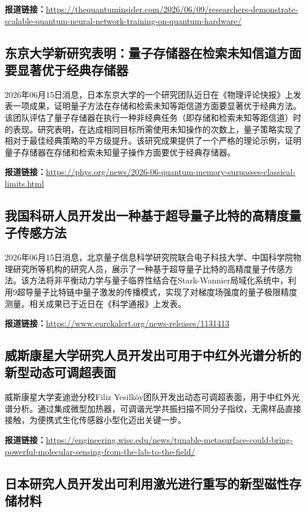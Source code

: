 \documentclass[12pt,a4paper]{ctexart}
\begin{document}
\noindent\textbf{报道链接：}\url{https://thequantuminsider.com/2026/06/09/researchers-demonstrate-scalable-quantum-neural-network-training-on-quantum-hardware/}

\subsection{ 东京大学新研究表明：量子存储器在检索未知信道方面要显著优于经典存储器 }

2026年06月15日消息，日本东京大学的一个研究团队近日在《物理评论快报》上发表一项成果，证明量子方法在存储和检索未知等距信道方面要显著优于经典方法。该团队评估了量子存储器在执行一种非经典任务（即存储和检索未知等距信道）时的表现。研究表明，在达成相同目标所需使用未知操作的次数上，量子策略实现了相对于最佳经典策略的平方级提升。该研究成果提供了一个严格的理论示例，证明量子存储器在存储和检索未知量子操作方面要优于经典存储器。

\noindent\textbf{报道链接：}\url{https://phys.org/news/2026-06-quantum-memory-surpasses-classical-limits.html}

\subsection{ 我国科研人员开发出一种基于超导量子比特的高精度量子传感方法 }

2026年06月15日消息，北京量子信息科学研究院联合电子科技大学、中国科学院物理研究所等机构的研究人员，展示了一种基于超导量子比特的高精度量子传感方法。该方法将非平衡动力学与量子临界性结合在Stark-Wannier局域化系统中，利用9超导量子比特链中量子激发的传播模式，实现了对梯度场强度的量子极限精度测量。相关成果已于近日在《科学通报》上发表。

\noindent\textbf{报道链接：}\url{https://www.eurekalert.org/news-releases/1131413}

\subsection{ 威斯康星大学研究人员开发出可用于中红外光谱分析的新型动态可调超表面 }

威斯康星大学麦迪逊分校Filiz Yesilköy团队开发出动态可调超表面，用于中红外光谱分析。通过集成微型加热器，可调谐光学共振扫描不同分子指纹，无需样品直接接触，为便携式生化传感器小型化迈出关键一步。

\noindent\textbf{报道链接：}\url{https://engineering.wisc.edu/news/tunable-metasurface-could-bring-powerful-molecular-sensing-from-the-lab-to-the-field/}

\subsection{ 日本研究人员开发出可利用激光进行重写的新型磁性存储材料 }
\end{document}
